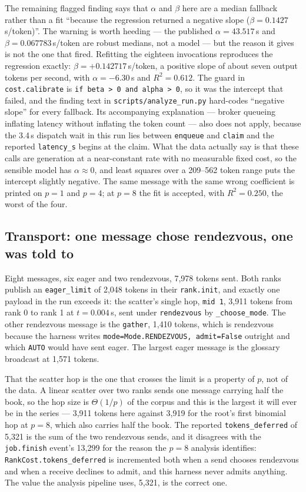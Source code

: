 \documentclass[11pt]{article}
\begin{document}
The remaining flagged finding says that $\alpha$ and $\beta$ here are a median fallback rather
than a fit ``because the regression returned a negative slope ($\beta=0.1427$\,s/token)''. The
warning is worth heeding --- the published $\alpha=43.517$\,s and $\beta=0.067783$\,s/token are
robust medians, not a model --- but the reason it gives is not the one that fired. Refitting the
eighteen invocations reproduces the regression exactly: $\beta=+0.142717$\,s/token, a positive
slope of about seven output tokens per second, with $\alpha=-6.30$\,s and $R^2=0.612$. The guard
in \texttt{cost.calibrate} is \texttt{if beta > 0 and alpha > 0}, so it was the intercept that
failed, and the finding text in \texttt{scripts/analyze\_run.py} hard-codes ``negative slope'' for
every fallback. Its accompanying explanation --- broker queueing inflating latency without
inflating the token count --- also does not apply, because the 3.4\,s dispatch wait in this run
lies between \texttt{enqueue} and \texttt{claim} and the reported \texttt{latency\_s} begins at
the claim. What the data actually say is that these calls are generation at a near-constant rate
with no measurable fixed cost, so the sensible model has $\alpha\approx0$, and least squares over
a 209--562 token range puts the intercept slightly negative. The same message with the same wrong
coefficient is printed on $p=1$ and $p=4$; at $p=8$ the fit is accepted, with $R^2=0.250$, the
worst of the four.

\subsection*{Transport: one message chose rendezvous, one was told to}

Eight messages, six eager and two rendezvous, 7{,}978 tokens sent. Both ranks publish an
\texttt{eager\_limit} of 2{,}048 tokens in their \texttt{rank.init}, and exactly one payload in
the run exceeds it: the scatter's single hop, \texttt{mid 1}, 3{,}911 tokens from rank 0 to rank 1
at $t=0.004$\,s, sent under \texttt{rendezvous} by \texttt{\_choose\_mode}. The other rendezvous
message is the \texttt{gather}, 1{,}410 tokens, which is rendezvous because the harness writes
\texttt{mode=Mode.RENDEZVOUS, admit=False} outright and which \texttt{AUTO} would have sent eager.
The largest eager message is the glossary broadcast at 1{,}571 tokens.

That the scatter hop is the one that crosses the limit is a property of $p$, not of the data. A
linear scatter over two ranks sends one message carrying half the book, so the hop size is
$\Theta(1/p)$ of the corpus and this is the largest it will ever be in the series --- 3{,}911
tokens here against 3{,}919 for the root's first binomial hop at $p=8$, which also carries half
the book. The reported \texttt{tokens\_deferred} of 5{,}321 is the sum of the two rendezvous
sends, and it disagrees with the \texttt{job.finish} event's 13{,}299 for the reason the $p=8$
analysis identifies: \texttt{RankCost.tokens\_deferred} is incremented both when a send chooses
rendezvous and when a receive declines to admit, and this harness never admits anything. The
value the analysis pipeline uses, 5{,}321, is the correct one.
\end{document}
